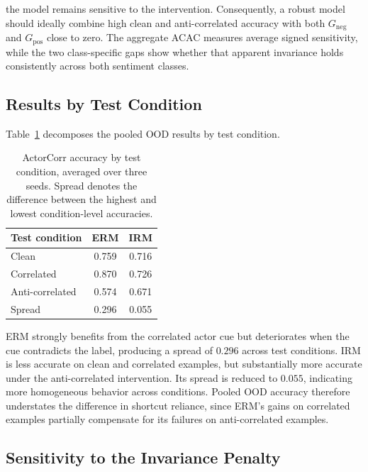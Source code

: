 \documentclass[11pt]{article}
\theoremstyle{definition}
\theoremstyle{plain}
\begin{document}
the model remains sensitive to the intervention. Consequently, a robust model should ideally combine high clean and anti-correlated accuracy with both $G_{\mathrm{neg}}$ and $G_{\mathrm{pos}}$ close to zero. The aggregate ACAC measures average signed sensitivity, while the two class-specific gaps show whether that apparent invariance holds consistently across both sentiment classes.


\subsection{Results by Test Condition}
\label{app:actorcorr-variant-results}

Table~\ref{tab:actorcorr-variants} decomposes the pooled OOD results by test condition.
\begin{table}[t]
\centering
\footnotesize
\setlength{\tabcolsep}{4pt}
\renewcommand{\arraystretch}{1.12}
\begin{tabular}{@{}lcc@{}}
\toprule
\textbf{Test condition} & \textbf{ERM} & \textbf{IRM} \\
\midrule Clean & 0.759 & 0.716 \\ Correlated & 0.870 & 0.726 \\
Anti-correlated & 0.574 & 0.671 \\ \midrule Spread & 0.296 & 0.055 \\
\bottomrule
\end{tabular}
\caption{ActorCorr accuracy by test condition, averaged over three seeds. Spread denotes the difference between the highest and lowest condition-level accuracies.}
\label{tab:actorcorr-variants}
\end{table}

ERM strongly benefits from the correlated actor cue but deteriorates when the cue contradicts the label, producing a spread of $0.296$ across test conditions. IRM is less accurate on clean and correlated examples, but substantially more accurate under the anti-correlated intervention. Its spread is reduced to $0.055$, indicating more homogeneous behavior across conditions. Pooled OOD accuracy therefore understates the difference in shortcut reliance, since ERM's gains on correlated examples partially compensate for its failures on anti-correlated examples.


\subsection{Sensitivity to the Invariance Penalty}
\label{app:actorcorr-lambda}
\end{document}
